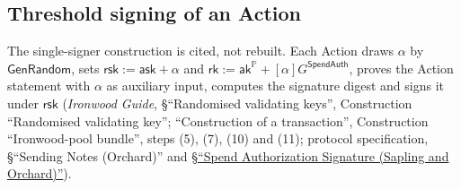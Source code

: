 \documentclass[11pt,a4paper]{article}
\theoremstyle{definition}
\newcommand{\PP}{\mathbb{P}}
\newcommand{\rk}{\mathsf{rk}}
\newcommand{\ask}{\ensuremath{\mathsf{ask}}}
\newcommand{\aksym}{\ensuremath{\mathsf{ak}}}
\newcommand{\rsk}{\ensuremath{\mathsf{rsk}}}
\begin{document}
\subsection{Threshold signing of an Action}\label{sec:auth-action}

The single-signer construction is cited, not rebuilt. Each Action draws
\(\alpha\) by \(\mathsf{GenRandom}\), sets \(\rsk := \ask + \alpha\) and
\(\rk := \aksym^{\PP} + [\alpha]G^{\mathsf{SpendAuth}}\), proves the Action
statement with \(\alpha\) as auxiliary input, computes the signature digest
and signs it under \(\rsk\) (\emph{Ironwood Guide}, \S``Randomised validating
keys'', Construction ``Randomised validating key''; ``Construction of a
transaction'', Construction ``Ironwood-pool bundle'', steps (5), (7), (10)
and (11); protocol specification, \S``Sending Notes (Orchard)'' and
\href{https://zips.z.cash/protocol/protocol.pdf\#spendauthsig}%
{\S``Spend Authorization Signature (Sapling and Orchard)''}).
\end{document}
